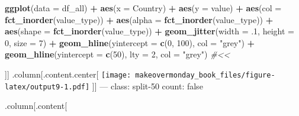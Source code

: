 \documentclass[]{book}
\newenvironment{Shaded}{\begin{snugshade}}{\end{snugshade}}
\newcommand{\KeywordTok}[1]{\textcolor[rgb]{0.13,0.29,0.53}{\textbf{#1}}}
\newcommand{\DataTypeTok}[1]{\textcolor[rgb]{0.13,0.29,0.53}{#1}}
\newcommand{\DecValTok}[1]{\textcolor[rgb]{0.00,0.00,0.81}{#1}}
\newcommand{\StringTok}[1]{\textcolor[rgb]{0.31,0.60,0.02}{#1}}
\newcommand{\CommentTok}[1]{\textcolor[rgb]{0.56,0.35,0.01}{\textit{#1}}}
\newcommand{\OperatorTok}[1]{\textcolor[rgb]{0.81,0.36,0.00}{\textbf{#1}}}
\newcommand{\NormalTok}[1]{#1}
\theoremstyle{definition}
\theoremstyle{definition}
\theoremstyle{definition}
\theoremstyle{remark}
\begin{document}
\begin{Shaded}
\begin{Highlighting}[]
\KeywordTok{ggplot}\NormalTok{(}\DataTypeTok{data =}\NormalTok{ df_all) }\OperatorTok{+}
\StringTok{  }\KeywordTok{aes}\NormalTok{(}\DataTypeTok{x =}\NormalTok{ Country) }\OperatorTok{+}
\StringTok{  }\KeywordTok{aes}\NormalTok{(}\DataTypeTok{y =}\NormalTok{ value) }\OperatorTok{+}
\StringTok{  }\KeywordTok{aes}\NormalTok{(}\DataTypeTok{col =} \KeywordTok{fct_inorder}\NormalTok{(value_type)) }\OperatorTok{+}
\StringTok{  }\KeywordTok{aes}\NormalTok{(}\DataTypeTok{alpha =} \KeywordTok{fct_inorder}\NormalTok{(value_type)) }\OperatorTok{+}
\StringTok{  }\KeywordTok{aes}\NormalTok{(}\DataTypeTok{shape =} \KeywordTok{fct_inorder}\NormalTok{(value_type)) }\OperatorTok{+}
\StringTok{  }\KeywordTok{geom_jitter}\NormalTok{(}\DataTypeTok{width =}\NormalTok{ .}\DecValTok{1}\NormalTok{, }\DataTypeTok{height =} \DecValTok{0}\NormalTok{, }\DataTypeTok{size =} \DecValTok{7}\NormalTok{) }\OperatorTok{+}
\StringTok{  }\KeywordTok{geom_hline}\NormalTok{(}\DataTypeTok{yintercept =} \KeywordTok{c}\NormalTok{(}\DecValTok{0}\NormalTok{, }\DecValTok{100}\NormalTok{), }\DataTypeTok{col =} \StringTok{"grey"}\NormalTok{) }\OperatorTok{+}
\StringTok{  }\KeywordTok{geom_hline}\NormalTok{(}\DataTypeTok{yintercept =} \KeywordTok{c}\NormalTok{(}\DecValTok{50}\NormalTok{), }\DataTypeTok{lty =} \DecValTok{2}\NormalTok{, }\DataTypeTok{col =} \StringTok{"grey"}\NormalTok{)  }\CommentTok{#<<}
\end{Highlighting}
\end{Shaded}

{]}{]} .column{[}.content.center{[}
\texttt{[image: makeovermonday\_book\_files/figure-latex/output9-1.pdf]}
{]}{]} --- class: split-50 count: false

.column{[}.content{[}
\end{document}
